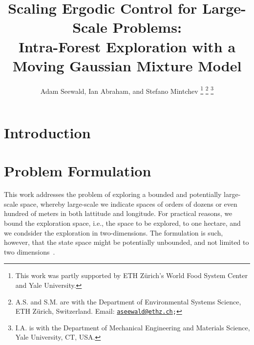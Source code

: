 \documentclass[letterpaper,10pt,conference,twoside]{IEEEtran}
\theoremstyle{definition}
\begin{document}

\title{\LARGE\bf Scaling Ergodic Control for Large-Scale Problems:\\Intra-Forest Exploration with a Moving Gaussian Mixture Model}

\author{Adam Seewald, Ian Abraham, and Stefano Mintchev
  \thanks{This work was partly supported by ETH Z{\"u}rich's World Food System Center and Yale University.}
  \thanks{A.\hspace*{.4ex}S. and S.\hspace*{.4ex}M. are with the Department of Environmental Systems Science, ETH Z{\"u}rich, Switzerland. Email: {\tt\footnotesize \href{mailto:aseewald@ethz.ch}{aseewald@ethz.ch};}}
  \thanks{I.\hspace*{.4ex}A. is with the Department of Mechanical Engineering and Materials Science, Yale University, CT, USA.}
}

\maketitle

\vspace*{-.5cm}
\begin{abstract} 
\end{abstract}



\section{Introduction}
\noindent
\cite{seewald2022energy}


\section{Problem Formulation}\label{sec:pb}
\noindent
This work addresses the problem of exploring a bounded and potentially large-scale space, whereby large-scale we indicate spaces of orders of dozens or even hundred of meters in both lattitude and longitude. For practical reasons, we bound the exploration space, i.e., the space to be explored, to one hectare, and we condsider the exploration in two-dimensions. The formulation is such, however, that the state space might be potentially unbounded, and not limited to two dimensions~\cite{dong2023time}.
\end{document}
